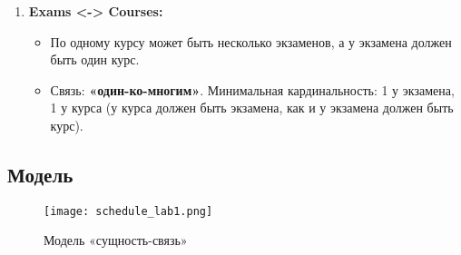 \documentclass[a4paper, 14pt]{extarticle}
\begin{document}
\begin{enumerate}
    \item \textbf{Exams <-> Courses:}
        \begin{itemize}
            \item По одному курсу может быть несколько экзаменов, а у экзамена должен быть один курс.
            \item Связь: \textbf{«один-ко-многим»}. Минимальная кардинальность: 1 у экзамена, 1 у курса (у курса должен быть экзамена, как и у экзамена должен быть курс).
        \end{itemize}
\end{enumerate}

\newpage

\subsection{Модель}\label{Sect::task}
\begin{figure}[!htb]
	\centering
	\texttt{[image: schedule\_lab1.png]}
\caption{Модель «сущность-связь»}
\label{fig:system.png}
\end{figure}
\end{document}
